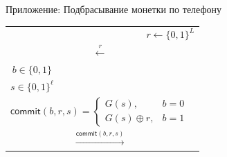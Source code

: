 \documentclass[usenames,dvipsnames,8pt,aspectratio=169]{beamer}
\begin{document}
\begin{frame}{Приложение: Подбрасывание монетки по телефону}
\begin{center}
\begin{tabular}{c c c c c}
		&  &  & & $r \leftarrow \{0,1\}^{L}$  \\
		&  & $\xleftarrow{r}$ & &  \\
		$b \in \{0,1\}$&  & & &  \\
		$s \in \{0,1\}^{\ell}$&  & & &  \\[35pt]
		\multicolumn{5}{l}{$\mathsf{commit}(b, r, s)  = 
			\begin{cases}
			G(s), & b = 0\\
			G(s) \oplus r, & b=1
			\end{cases}
			$}  \\
		&  & $\xrightarrow{\mathsf{commit}(b, r, s)} $ & &  \\
	\end{tabular}
\end{center}

\end{frame}
\end{document}
